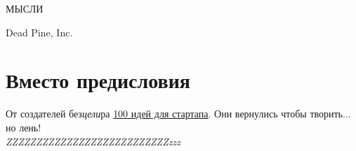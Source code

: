 \documentclass{ideas}
\renewcommand{\author}{Dead Pine, Inc.}
\begin{document}
\begin{titlepage}

\vspace*{\fill}
\begin{center}
{\selectfont\Huge МЫСЛИ}    
\end{center}
\vspace*{\fill}
\begin{center}
\author\\\the\year
\end{center}
\end{titlepage}
\section*{Вместо предисловия}
\vspace*{\fill}
    От создателей без\emph{цели}ра \href{https://antoniii.github.io/}{100 идей для стартапа}.
    Они вернулись чтобы творить... но лень!\\

    \emph{\Huge{ZZZ}\LARGE{ZZZ}\Large{ZZZ}\large{ZZZ}ZZZ\small{ZZZ}\footnotesize{ZZZ}\scriptsize{ZZZ}\tiny{ZZZ}\tiny{zzz}}
\end{document}
